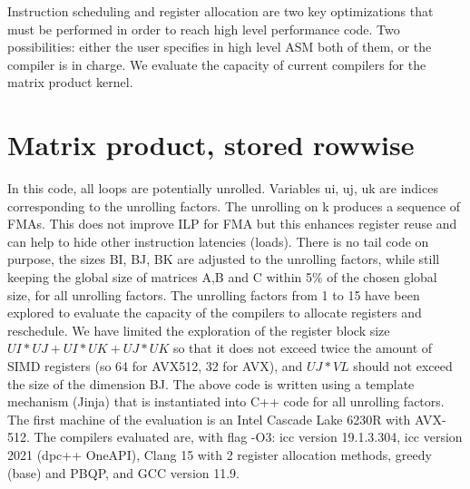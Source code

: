\documentclass[sigconf,review]{acmart}
\begin{document}
Instruction scheduling and register allocation are two key optimizations that must be performed in order to reach high level performance code. Two possibilities: either the user specifies in high level ASM both of them, or the compiler is in charge. We evaluate the capacity of current compilers for the matrix product kernel.

\section{Matrix product, stored rowwise}
In this code, all loops are potentially unrolled. Variables ui, uj, uk
are indices corresponding to the unrolling factors. The unrolling on k
produces a sequence of FMAs. This does not improve ILP for FMA but
this enhances register reuse and can help to hide other instruction
latencies (loads).  There is no tail code on purpose, the sizes BI,
BJ, BK are adjusted to the unrolling factors, while still keeping the
global size of matrices A,B and C within 5\% of the chosen global
size, for all unrolling factors.  The unrolling factors from 1 to 15
have been explored to evaluate the capacity of the compilers to
allocate registers and reschedule. We have limited the exploration of
the register block size $UI*UJ+UI*UK+UJ*UK$ so that it does not exceed
twice the amount of SIMD registers (so 64 for AVX512, 32 for AVX), and
$UJ*VL$ should not exceed the size of the dimension BJ. The above code
is written using a template mechanism (Jinja) that is instantiated
into C++ code for all unrolling factors.  The first machine of the
evaluation is an Intel Cascade Lake 6230R with AVX-512. The compilers
evaluated are, with flag -O3: icc version 19.1.3.304, icc version 2021
(dpc++ OneAPI), Clang 15 with 2 register allocation methods, greedy
(base) and PBQP, and GCC version 11.9.
\end{document}
